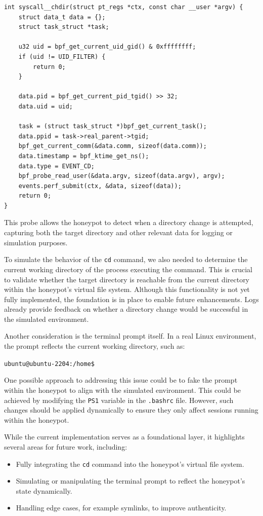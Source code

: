 \begin{lstlisting}
int syscall__chdir(struct pt_regs *ctx, const char __user *argv) {
    struct data_t data = {};
    struct task_struct *task;

    u32 uid = bpf_get_current_uid_gid() & 0xffffffff;
    if (uid != UID_FILTER) {
        return 0;
    }

    data.pid = bpf_get_current_pid_tgid() >> 32;
    data.uid = uid;

    task = (struct task_struct *)bpf_get_current_task();
    data.ppid = task->real_parent->tgid;
    bpf_get_current_comm(&data.comm, sizeof(data.comm));
    data.timestamp = bpf_ktime_get_ns();
    data.type = EVENT_CD;
    bpf_probe_read_user(&data.argv, sizeof(data.argv), argv);
    events.perf_submit(ctx, &data, sizeof(data));
    return 0;
}
\end{lstlisting}

This probe allows the honeypot to detect when a directory change is attempted, capturing both the target directory and other relevant data for logging or simulation purposes.

To simulate the behavior of the \texttt{cd} command, we also needed to determine the current working directory of the process executing the command. This is crucial to validate whether the target directory is reachable from the current directory within the honeypot's virtual file system. Although this functionality is not yet fully implemented, the foundation is in place to enable future enhancements. Logs already provide feedback on whether a directory change would be successful in the simulated environment.

Another consideration is the terminal prompt itself. In a real Linux environment, the prompt reflects the current working directory, such as:

\texttt{ubuntu@ubuntu-2204:/home\$}

One possible approach to addressing this issue could be to fake the prompt within the honeypot to align with the simulated environment. This could be achieved by modifying the \texttt{PS1} variable in the \texttt{.bashrc} file. However, such changes should be applied dynamically to ensure they only affect sessions running within the honeypot.

While the current implementation serves as a foundational layer, it highlights several areas for future work, including:

\begin{itemize}
    \item Fully integrating the \texttt{cd} command into the honeypot’s virtual file system.
    \item Simulating or manipulating the terminal prompt to reflect the honeypot’s state dynamically.
    \item Handling edge cases, for example symlinks, to improve authenticity.
\end{itemize}

